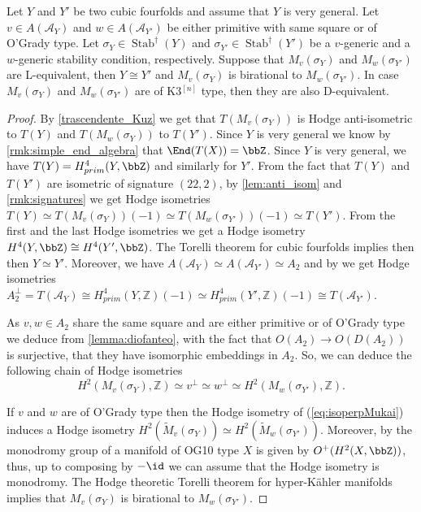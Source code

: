 \documentclass{amsart}
\DeclareMathOperator{\Stab}{Stab}
\begin{document}
\begin{proposition}\label{prop:LEquivalenceKuznetsov}
    Let $Y$ and $Y'$ be two cubic fourfolds and assume that $Y$ is very general. Let $v\in A(\mathcal{A}_Y)$ and $w\in A(\mathcal{A}_{Y'})$ be either primitive with same square or of O'Grady type. Let $\sigma_Y\in\Stab^{\dagger}(Y)$ and $\sigma_{Y'}\in\Stab^{\dagger}(Y')$ be a $v$-generic and a $w$-generic stability condition, respectively. Suppose that \(M_v(\sigma_Y)\) and \(M_w(\sigma_{Y'})\) are L-equivalent, then $Y\cong Y'$ and \(M_v(\sigma_Y)\) is birational to \(M_w(\sigma_{Y'})\). In case \(M_v(\sigma_Y)\) and \(M_w(\sigma_{Y'})\) are of K3\(^{[n]}\) type, then they are also D-equivalent.
\end{proposition}
\begin{proof}
    By \autoref{trascendente_Kuz} we get that $T(M_v(\sigma_Y))$ is Hodge anti-isometric to $T(Y)$ and $T(M_w(\sigma_{Y}))$ to $T(Y')$. Since $Y$ is very general we know by \autoref{rmk:simple_end_algebra} that \(\End(T(X))=\bbZ\). Since $Y$ is very general, we have \(T(Y)=H_{prim}^4(Y,\bbZ)\) and similarly for \(Y'\). From the fact that \(T(Y)\) and \(T(Y')\) are isometric of signature \((22,2)\), by \autoref{lem:anti_isom} and \autoref{rmk:signatures} we get Hodge isometries $T(Y)\simeq T(M_v(\sigma_Y))(-1)\simeq T(M_w(\sigma_{Y'}))(-1)\simeq T(Y')$. From the first and the last Hodge isometries we get a Hodge isometry \(H^4(Y,\bbZ)\cong H^4(Y',\bbZ)\). The Torelli theorem for cubic fourfolds implies then then $Y\simeq Y'$. Moreover, we have $A(\mathcal{A}_Y)\simeq A(\mathcal{A}_{Y'})\simeq A_2$ and by \cite[Proposition 2.8]{AT} we get Hodge isometries $A_2^{\perp}=T(\mathcal{A}_Y)\cong  H^4_{prim}(Y, \mathbb{Z})(-1)\simeq H^4_{prim}(Y', \mathbb{Z})(-1)\cong T(\mathcal{A}_{Y'})$. 
    
   
 
    As $v, w\in A_2$ share the same square and are either primitive or of O'Grady type we deduce from \autoref{lemma:diofanteo}, with the fact that \(O(A_2)\to O(D({A_2}))\) is surjective, that they have isomorphic embeddings in $A_2$. So, we can deduce the following chain of Hodge isometries 
    \begin{equation}\label{eq:isoperpMukai}
    H^2(M_v(\sigma_Y), \mathbb{Z})\simeq v^{\perp}\simeq w^{\perp}\simeq H^2(M_w(\sigma_{Y'}), \mathbb{Z}).
    \end{equation}
    
    If $v$ and $w$ are of O'Grady type then the Hodge isometry of (\ref{eq:isoperpMukai}) induces a Hodge isometry $H^2(\widetilde{M}_v(\sigma_Y))\simeq H^2(\widetilde{M}_w(\sigma_{Y'}))$. Moreover, by \cite{onorati_monodromy} the monodromy group of a manifold of OG10 type \(X\) is given by \(O^+(H^2(X,\bbZ))\), thus, up to composing by \(-\id\) we can assume that the Hodge isometry is monodromy. The Hodge theoretic Torelli theorem for hyper-Kähler manifolds \cite[Theorem 1.3]{markman2011survey} implies that  \(M_v(\sigma_Y)\) is birational to \(M_w(\sigma_{Y'})\). 
    

\end{proof}
\end{document}
